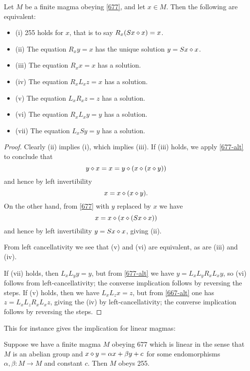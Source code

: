 \begin{lemma}\label{255-equiv} Let $M$ be a finite magma obeying \eqref{677}, and let $x \in M$.  Then the following are equivalent:
\begin{itemize}
  \item (i)  255 holds for $x$, that is to say $R_x (Sx \diamond x) = x$.
  \item (ii) The equation $R_x y = x$ has the unique solution $y = Sx \diamond x$.
  \item (iii) The equation $R_x x = x$ has a solution.
  \item (iv) The equation $R_x L_x z = x$ has a solution.
  \item (v) The equation $L_x R_x z = z$ has a solution.
  \item (vi) The equation $R_x L_x y = y$ has a solution.
  \item (vii) The equation $L_x S y = y$ has a solution.
\end{itemize}
\end{lemma}

\begin{proof} Clearly (ii) implies (i), which implies (iii).  If (iii) holds,
  we apply \eqref{677-alt} to conclude that
  $$ y \diamond x = x = y \diamond (x \diamond (x \diamond y))$$
  and hence by left invertibility
  $$ x = x \diamond (x \diamond y).$$
  On the other hand, from \eqref{677} with $y$ replaced by $x$ we have
  $$ x = x \diamond (x \diamond (Sx \diamond x))$$
 and hence by left invertibility $y = Sx \diamond x$, giving (ii).

From left cancellativity we see that (v) and (vi) are equivalent, as are (iii) and (iv).

If (vii) holds, then $L_x L_y y = y$, but from \eqref{677-alt} we have $y = L_x L_y R_x L_x y$, so (vi) follows from left-cancellativity; the converse implication follows by reversing the steps.  If (v) holds, then we have $L_x L_z x = z$, but from \eqref{667-alt} one has $z = L_x L_z R_x L_x z$, giving the (iv) by left-cancellativity; the converse implication follows by reversing the steps.
\end{proof}


This for instance gives the implication for linear magmas:

\begin{lemma}\label{linear-obstruction}  Suppose we have a finite magma $M$ obeying 677 which is linear in the sense that $M$ is an abelian group and $x \diamond y = \alpha x + \beta y + c$ for some endomorphisms $\alpha,\beta: M \to M$ and constant $c$.  Then $M$ obeys 255.
\end{lemma}


